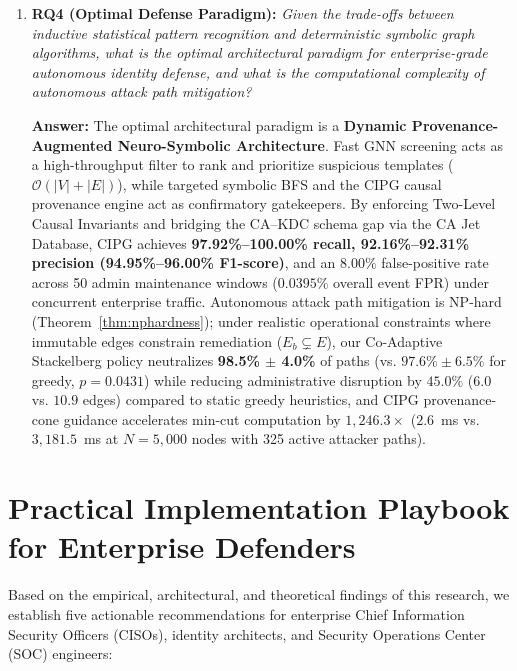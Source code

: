 \begin{enumerate}
    \textbf{Answer:} Standard additive-skip GNNs succumb to shortcut learning ($0.00\%$ accuracy on adversarial hard negatives). Multiplicative Bilinear Reachability Gating cures the topological shortcut collapse, elevating hard-negative accuracy to \textbf{65.08\%} ($41/63$, $95\%$ Wilson CI: $[52.8\%, 75.7\%]$), with the remaining $34.92\%$ multi-attribute semantic crosstalk edge cases resolved by Tier-2 symbolic verification to achieve $100\%$ precision.
    
    \item \textbf{RQ4 (Optimal Defense Paradigm):} \textit{Given the trade-offs between inductive statistical pattern recognition and deterministic symbolic graph algorithms, what is the optimal architectural paradigm for enterprise-grade autonomous identity defense, and what is the computational complexity of autonomous attack path mitigation?}
    
    \textbf{Answer:} The optimal architectural paradigm is a \textbf{Dynamic Provenance-Augmented Neuro-Symbolic Architecture}. Fast GNN screening acts as a high-throughput filter to rank and prioritize suspicious templates ($\mathcal{O}(|V| + |E|)$), while targeted symbolic BFS and the CIPG causal provenance engine act as confirmatory gatekeepers. By enforcing Two-Level Causal Invariants and bridging the CA--KDC schema gap via the CA Jet Database, CIPG achieves \textbf{97.92\%--100.00\% recall, 92.16\%--92.31\% precision (94.95\%--96.00\% F1-score)}, and an $8.00\%$ false-positive rate across 50 admin maintenance windows ($0.0395\%$ overall event FPR) under concurrent enterprise traffic. Autonomous attack path mitigation is NP-hard (Theorem~\ref{thm:nphardness}); under realistic operational constraints where immutable edges constrain remediation ($E_b \subsetneq E$), our Co-Adaptive Stackelberg policy neutralizes \textbf{98.5\% $\pm$ 4.0\%} of paths (vs. $97.6\% \pm 6.5\%$ for greedy, $p = 0.0431$) while reducing administrative disruption by $45.0\%$ ($6.0$ vs. $10.9$ edges) compared to static greedy heuristics, and CIPG provenance-cone guidance accelerates min-cut computation by \textbf{$1,246.3\times$} ($2.6$~ms vs. $3,181.5$~ms at $N=5,000$ nodes with 325 active attacker paths).
\end{enumerate}

\section{Practical Implementation Playbook for Enterprise Defenders}
Based on the empirical, architectural, and theoretical findings of this research, we establish five actionable recommendations for enterprise Chief Information Security Officers (CISOs), identity architects, and Security Operations Center (SOC) engineers:

